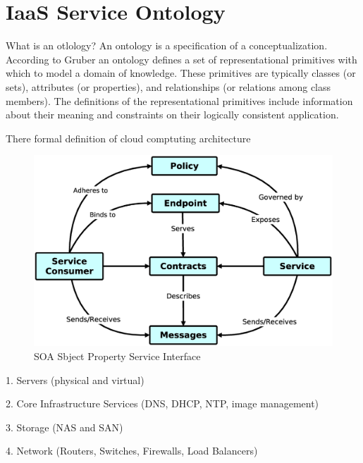 
\section{IaaS Service Ontology}
\label{chap:ontology}

What is an otlology? An ontology is a specification of a conceptualization. According to Gruber \cite{OntologyDefinition} an ontology defines a set of representational primitives with which to model a domain of knowledge. These  primitives are typically classes (or sets), attributes (or properties), and relationships (or relations among class members). The definitions of the representational primitives include information about their meaning and constraints on their logically consistent application.




There formal definition of cloud comptuting architecture 

\begin{figure}[!h]
\centering
\includegraphics[scale=.2]{img/soa_relation.eps}
\caption{SOA Sbject Property Service Interface}
\label{fig:cm}
\end{figure}

1. Servers (physical and virtual)

2. Core Infrastructure Services (DNS, DHCP, NTP, image management)

3. Storage (NAS and SAN)

4. Network (Routers, Switches, Firewalls, Load Balancers)


